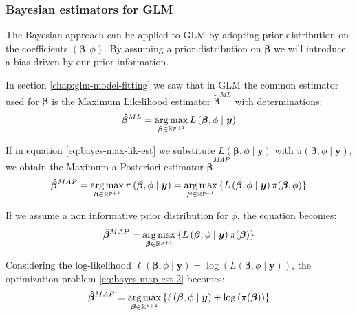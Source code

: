 \documentclass[a4paper, nobind]{templates/ociamthesis}
\theoremstyle{definition}
\theoremstyle{definition}
\theoremstyle{definition}
\theoremstyle{remark}
\begin{document}
\hypertarget{bayesian-estimators-for-glm}{%
\subsubsection{Bayesian estimators for GLM}\label{bayesian-estimators-for-glm}}

The Bayesian approach can be applied to GLM by adopting prior distribution on the coefficients \((\boldsymbol{\beta}, \phi)\). By assuming a prior distribution on \(\boldsymbol{\beta}\) we will introduce a bias driven by our prior information.

In section \ref{chap:glm-model-fitting} we saw that in GLM the common estimator used for \(\boldsymbol{\beta}\) is the Maximum Likelihood estimator \(\tilde{\boldsymbol{\beta}}^{ML}\) with determinations:
\begin{equation}
\label{eq:bayes-max-lik-est}
\hat{\boldsymbol{\beta}}^{ML} = \operatorname*{arg\,max}_{\boldsymbol{\beta}\in\mathbb{R}^{p+1}}{L\left(\boldsymbol{\beta}, \phi \mid \boldsymbol{y}\right)}
\end{equation}

If in equation \eqref{eq:bayes-max-lik-est} we substitute \(L\left(\boldsymbol{\beta}, \phi \mid \boldsymbol{y}\right)\) with \(\pi\left(\boldsymbol{\beta}, \phi \mid \boldsymbol{y}\right)\), we obtain the Maximum a Posteriori estimator \(\tilde{\boldsymbol{\beta}}^{MAP}\)
\begin{equation}
\label{eq:bayes-map-est-1}
\hat{\boldsymbol{\beta}}^{MAP} = \operatorname*{arg\,max}_{\boldsymbol{\beta}\in\mathbb{R}^{p+1}}{\pi\left(\boldsymbol{\beta}, \phi \mid \boldsymbol{y}\right)}
=
\operatorname*{arg\,max}_{\boldsymbol{\beta}\in\mathbb{R}^{p+1}}{\left\{L\left(\boldsymbol{\beta}, \phi \mid \boldsymbol{y}\right) \pi(\boldsymbol{\beta}, \phi) \right\}}
\end{equation}

If we assume a non informative prior distribution for \(\phi\), the equation becomes:
\begin{equation}
\label{eq:bayes-map-est-2}
\hat{\boldsymbol{\beta}}^{MAP} =
\operatorname*{arg\,max}_{\boldsymbol{\beta}\in\mathbb{R}^{p+1}}{\left\{L\left(\boldsymbol{\beta}, \phi \mid \boldsymbol{y}\right) \pi(\boldsymbol{\beta}) \right\}}
\end{equation}

Considering the log-likelihood \(\ell\left(\boldsymbol{\beta}, \phi \mid \boldsymbol{y}\right) = \log{\left( L\left( \boldsymbol{\beta}, \phi \mid \boldsymbol{y} \right)\right)}\), the optimization problem \eqref{eq:bayes-map-est-2} becomes:
\begin{equation}
\label{eq:bayes-map-est-3}
\hat{\boldsymbol{\beta}}^{MAP} =
\operatorname*{arg\,max}_{\boldsymbol{\beta}\in\mathbb{R}^{p+1}}{\left\{\ell\left(\boldsymbol{\beta}, \phi \mid \boldsymbol{y}\right) + \log{\left(\pi(\boldsymbol{\beta})\right)} \right\}}
\end{equation}
\end{document}
